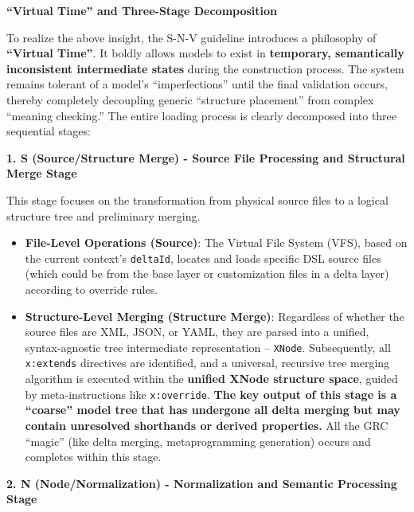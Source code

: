 \documentclass[11pt]{article}
\begin{document}
\textbf{``Virtual Time'' and Three-Stage Decomposition}

To realize the above insight, the S-N-V guideline introduces a philosophy of \textbf{``Virtual Time''}. It boldly allows models to exist in \textbf{temporary, semantically inconsistent intermediate states} during the construction process. The system remains tolerant of a model's ``imperfections'' until the final validation occurs, thereby completely decoupling generic ``structure placement'' from complex ``meaning checking.'' The entire loading process is clearly decomposed into three sequential stages:

\textbf{1. S (Source/Structure Merge) - Source File Processing and Structural Merge Stage}

This stage focuses on the transformation from physical source files to a logical structure tree and preliminary merging.
\begin{itemize}
\item \textbf{File-Level Operations (Source)}: The Virtual File System (VFS), based on the current context's \texttt{deltaId}, locates and loads specific DSL source files (which could be from the base layer or customization files in a delta layer) according to override rules.
\item \textbf{Structure-Level Merging (Structure Merge)}: Regardless of whether the source files are XML, JSON, or YAML, they are parsed into a unified, syntax-agnostic tree intermediate representation -- \texttt{XNode}. Subsequently, all \texttt{x:extends} directives are identified, and a universal, recursive tree merging algorithm is executed within the \textbf{unified XNode structure space}, guided by meta-instructions like \texttt{x:override}. \textbf{The key output of this stage is a ``coarse'' model tree that has undergone all delta merging but may contain unresolved shorthands or derived properties.} All the GRC ``magic'' (like delta merging, metaprogramming generation) occurs and completes within this stage.
\end{itemize}

\textbf{2. N (Node/Normalization) - Normalization and Semantic Processing Stage}
\end{document}
